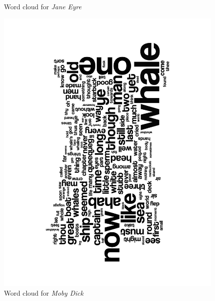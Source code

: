 \documentclass[a4paper,11pt,oneside]{book}
\begin{document}
\begin{enumerate}
\begin{figure}[htb]
\begin{center}
					\end{center}
					\caption{Word cloud for \emph{Jane Eyre}}%
					\label{wcJane}%
				\end{figure}
				\begin{figure}[htb] 
					\begin{center}
					\includegraphics[angle=270,width=0.8\columnwidth]{resources/wordclouds/MobyDick_WordCloud.pdf}%
					\end{center}
					\caption{Word cloud for \emph{Moby Dick}}%
					\label{wcMoby}%
				\end{figure}
				\begin{figure}[htb] 
					\begin{center}

\end{center}
\end{figure}
\end{enumerate}
\end{document}
